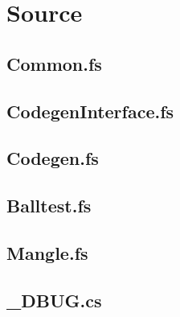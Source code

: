 \documentclass[10pt,a4paper]{article}
\begin{document}
\renewcommand\thesection{\Alph{section}}
\newpage

\section{Source}
\subsection{Common.fs} 

\subsection{CodegenInterface.fs} 

\subsection{Codegen.fs} 

\subsection{Balltest.fs} 

\subsection{Mangle.fs} 

\subsection{\_DBUG.cs}

\end{document}
